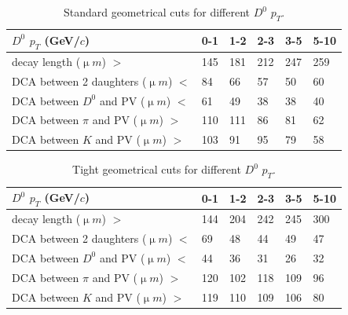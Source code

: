 \documentclass[a4paper]{article}
\begin{document}
\begin{table}[htp]
  \centering
  \caption{Standard geometrical cuts for different $D^0$ $p_T$.}
  \label{geometryCuts}
  \begin{center}
    \begin{tabular}{l|l|l|l|l|l}
      $D^0$ $p_T$ (GeV/$c$) & 0-1 & 1-2 & 2-3 & 3-5 & 5-10\\ \hline
      decay length (${\upmu}m$) $>$ & 145 & 181 & 212 & 247 & 259\\ \hline
      DCA between 2 daughters (${\upmu}m$) $<$ & 84 & 66 & 57 & 50 & 60\\ \hline
      DCA between $D^0$ and PV (${\upmu}m$) $<$ & 61 & 49 & 38 & 38 & 40\\ \hline
      DCA between $\pi$ and PV (${\upmu}m$) $>$ & 110 & 111 & 86 & 81 & 62\\ \hline
      DCA between $K$ and PV (${\upmu}m$) $>$ & 103 & 91 & 95 & 79 & 58\\ \hline
    \end{tabular}
  \end{center}
\end{table}

\begin{table}[htp]
  \centering
  \caption{Tight geometrical cuts for different $D^0$ $p_T$.}
  \label{geometryCutsTight}
  \begin{center}
    \begin{tabular}{l|l|l|l|l|l}
      $D^0$ $p_T$ (GeV/$c$) & 0-1 & 1-2 & 2-3 & 3-5 & 5-10\\ \hline
      decay length (${\upmu}m$) $>$ & 144 & 204 & 242 & 245 & 300\\\hline
      DCA between 2 daughters (${\upmu}m$) $<$ & 69 & 48 & 44 & 49 & 47\\ \hline
      DCA between $D^0$ and PV (${\upmu}m$) $<$ & 44 & 36 & 31 & 26 & 32\\ \hline
      DCA between $\pi$ and PV (${\upmu}m$) $>$ & 120 & 102 & 118 & 109 & 96\\ \hline
      DCA between $K$ and PV (${\upmu}m$) $>$ & 119 & 110 & 109 & 106 & 80\\ \hline
    \end{tabular}
  \end{center}
\end{table}
\end{document}
